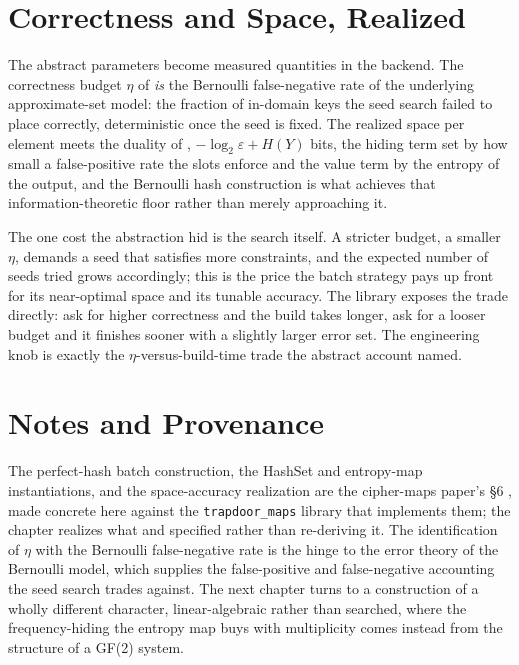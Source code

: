\section{Correctness and Space, Realized}
\label{sec:realized-cost}

The abstract parameters become measured quantities in the backend. The
correctness budget $\eta$ of  \emph{is} the Bernoulli
false-negative rate of the underlying approximate-set model: the fraction of
in-domain keys the seed search failed to place correctly, deterministic once
the seed is fixed. The realized space per element meets the duality of
, $-\log_2\varepsilon + H(Y)$ bits, the hiding term
set by how small a false-positive rate the slots enforce and the value term
by the entropy of the output, and the Bernoulli hash construction is what
achieves that information-theoretic floor rather than merely approaching it.

The one cost the abstraction hid is the search itself. A stricter budget, a
smaller $\eta$, demands a seed that satisfies more constraints, and the
expected number of seeds tried grows accordingly; this is the price the batch
strategy pays up front for its near-optimal space and its tunable accuracy.
The library exposes the trade directly: ask for higher correctness and the
build takes longer, ask for a looser budget and it finishes sooner with a
slightly larger error set. The engineering knob is exactly the
$\eta$-versus-build-time trade the abstract account named.

\section{Notes and Provenance}
\label{sec:ch11-notes}

The perfect-hash batch construction, the HashSet and entropy-map
instantiations, and the space-accuracy realization are the cipher-maps
paper's §6 \cite{towell2026cipher}, made concrete here against the
\texttt{trapdoor\_maps} library that implements them; the chapter realizes
what  and  specified rather
than re-deriving it. The identification of $\eta$ with the Bernoulli
false-negative rate is the hinge to the error theory of the Bernoulli model,
which supplies the false-positive and false-negative accounting the seed
search trades against. The next chapter turns to a construction of a wholly
different character, linear-algebraic rather than searched, where the
frequency-hiding the entropy map buys with multiplicity comes instead from
the structure of a GF(2) system.

